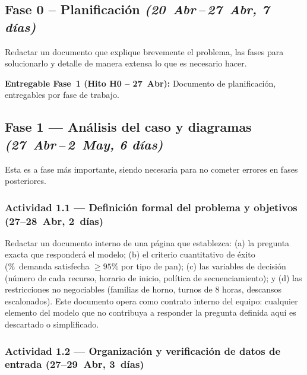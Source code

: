 \documentclass[12pt]{article}
\begin{document}

\subsection{Fase 0 -- Planificación
\quad\textit{(20~Abr\,--\,27~Abr, 7 días)}}

Redactar un documento que explique brevemente el problema, las fases para solucionarlo y detalle de manera extensa lo que es necesario hacer.

\medskip
\noindent\colorbox{grisclaro}{\parbox{\dimexpr\linewidth-2\fboxsep\relax}{\vspace{2pt}\textbf{Entregable Fase~1 (Hito H0 -- 27~Abr):} Documento de planificación, entregables por fase de trabajo.\vspace{2pt}}}


\subsection{Fase 1 --- Análisis del caso y diagramas \quad\textit{(27~Abr\,--\,2~May, 6 días)}}

Esta es a fase más importante, siendo necesaria para no cometer errores en fases posteriores.

\subsubsection{Actividad 1.1 --- Definición formal del problema y objetivos \quad(27--28~Abr, 2~días)}

Redactar un documento interno de una página que establezca: (a) la pregunta exacta que responderá el modelo; (b) el criterio cuantitativo de éxito (\%~demanda satisfecha $\geq 95$\% por tipo de pan); (c) las variables de decisión (número de cada recurso, horario de inicio, política de secuenciamiento); y (d) las restricciones no negociables (familias de horno, turnos de 8 horas, descansos escalonados). Este documento opera como contrato interno del equipo: cualquier elemento del modelo que no contribuya a responder la pregunta definida aquí es descartado o simplificado.

\subsubsection{Actividad 1.2 --- Organización y verificación de datos de entrada \quad(27--29~Abr, 3~días)}
\end{document}
